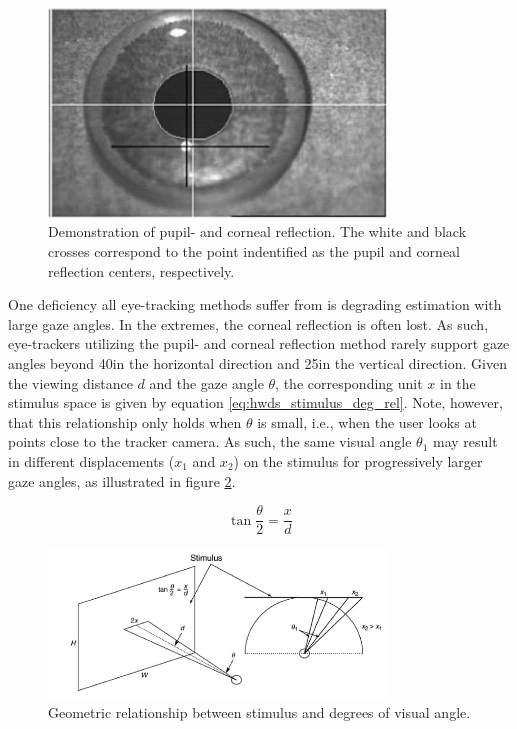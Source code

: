 \begin{figure}[h]
    \centering
    \includegraphics[width=0.8\textwidth]{Images/hwds_pupil_corneal_reflection.png}
    \caption{Demonstration of pupil- and corneal reflection. The white and black crosses correspond to the point indentified as the pupil and corneal reflection centers, respectively.}
    \label{fig:hwds_pupil_corneal_reflection}
\end{figure}

One deficiency all eye-tracking methods suffer from is degrading estimation with large gaze angles. In the extremes, the corneal reflection is often lost. As such, eye-trackers utilizing the pupil- and corneal reflection method rarely support gaze angles beyond 40\degree in the horizontal direction and 25\degree in the vertical direction. Given the viewing distance $d$ and the gaze angle $\theta$, the corresponding unit $x$ in the stimulus space is given by equation \ref{eq:hwds_stimulus_deg_rel}. Note, however, that this relationship only holds when $\theta$ is small, i.e., when the user looks at points close to the tracker camera. As such, the same visual angle $\theta_1$ may result in different displacements ($x_1$ and $x_2$) on the stimulus for progressively larger gaze angles, as illustrated in figure \ref{fig:hwds_stimulus_deg_rel}.

\begin{equation}
    \tan{\dfrac{\theta}{2}} = \dfrac{x}{d}
    \label{eq:hwds_stimulus_deg_rel}
\end{equation}


\begin{figure}[h]
    \centering
    \includegraphics[width=0.8\textwidth]{Images/hwds_angle_stimulus_relationship.png}
    \caption{Geometric relationship between stimulus and degrees of visual angle.}
    \label{fig:hwds_stimulus_deg_rel}
\end{figure}

